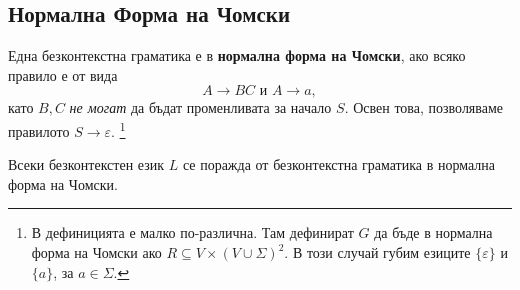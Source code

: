 \subsection{Нормална Форма на Чомски}
Една безконтекстна граматика е в {\bf нормална форма на Чомски}, ако
всяко правило е от вида
\[A \rightarrow BC\mbox{ и }A \rightarrow a,\]
като $B, C$ {\em не могат} да бъдат променливата за начало $S$.
Освен това, позволяваме правилото $S\to\varepsilon$.
\footnote{В \cite[стр. 151]{papadimitriou} дефиницията е малко по-различна.
Там дефинират $G$ да бъде в нормална форма на Чомски ако $R \subseteq V\times(V\cup\Sigma)^2$.
В този случай губим езиците $\{\varepsilon\}$ и $\{a\}$, за $a\in\Sigma$.}

\begin{framed}
  \begin{thm}
    Всеки безконтекстен език $L$ се поражда от безконтекстна граматика в нормална форма на Чомски.
  \end{thm}
\end{framed}
